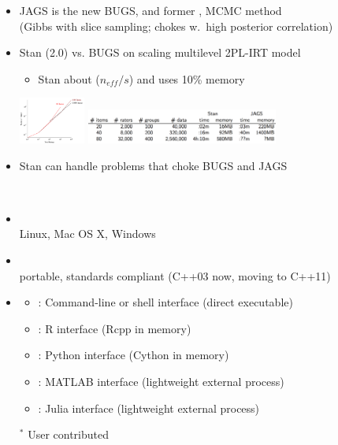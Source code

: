 \documentclass[10pt]{report}
\newcommand{\sld}[1]{\newpage{\noindent\LARGE \ \ \
    \textcolor{MidnightBlue}{\bfseries #1}}\vspace*{4pt}}
\newcommand{\spc}{\hspace*{0.25in}}
\newcommand{\myemph}[1]{{\color{MidnightBlue}{\bfseries #1}}}
\newcommand{\mypart}[2]{{\newpage 
    \mbox{ }
    \vfill
    \noindent\spc\color{MidnightBlue}{\LARGE\bfseries #1\\[10pt]\spc\Huge{#2}}
    \vfill\vfill}
  \mbox{ }}
\begin{document}
\sld{Stan vs. JAGS (BUGS)}
\begin{itemize}
\item JAGS is the new BUGS, and former \myemph{state-of-the-art}, \myemph{black-box} MCMC method
  \\ {\footnotesize (Gibbs with slice sampling; chokes w.\ high posterior correlation)}
\item Stan (2.0) vs. BUGS on scaling multilevel 2PL-IRT model
  \vspace*{-4pt}
  \begin{itemize}\footnotesize
  \item Stan about \myemph{10 times faster}  ($n_{eff}/s$) and uses
    10\% memory
  \end{itemize}
  \vspace*{-3pt}
  \vfill
  \hspace*{-12pt}
  \includegraphics[height=0.6in]{img/irt_scale-eps-converted-to.pdf}
  \includegraphics[height=0.45in]{img/irt-memory-2.png}
\item Stan can handle problems that choke BUGS and JAGS
\end{itemize}

\mypart{Part I}{Stan Front End}

\sld{Platforms and Interfaces}

\begin{itemize}
\item \myemph{Platforms}
  \\
  Linux, Mac OS X, Windows
\item \myemph{C++ API}
  \\
  {\footnotesize portable, standards compliant (C++03 now, moving to C++11)}
\item \myemph{Interfaces}
  \vspace*{-4pt}
  \begin{itemize}\footnotesize
  \item \myemph{CmdStan}: Command-line or shell interface (direct executable)
  \item \myemph{RStan}: R interface (Rcpp in memory)
  \item \myemph{PyStan}: Python interface (Cython in memory)
  \item \myemph{MatlabStan$^*$}: MATLAB interface (lightweight external process)
  \item \myemph{Stan.jl$^*$}: Julia interface (lightweight external process)
  \end{itemize}
  {\footnotesize ${}^*$ User contributed}
\end{itemize}
\vfill
\end{document}
